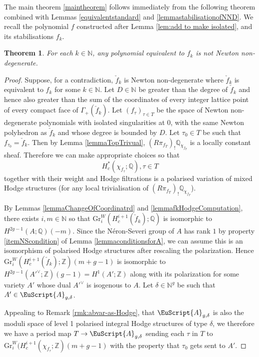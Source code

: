 \documentclass[11pt]{amsart}
\newtheorem{theorem}{Theorem}[section]
\newcommand{\scrA}{\EuScript{A}}
\newcommand{\bZ}{\mathbb{Z}}
\newcommand{\bQ}{\mathbb{Q}}
\newcommand{\bN}{\mathbb{N}}
\numberwithin{equation}{section}
\newcommand{\Gr}{\mathrm{Gr}}
\begin{document}
The main theorem \ref{maintheorem} follows immediately from the following theorem combined with Lemmas \ref{equivalentstandard} and \ref{lemmastabilisationofNND}. We recall the polynomial $f$ constructed after Lemma \ref{lem:add to make isolated}, and its stabilisations $f_k$.

\begin{theorem} \label{theoremfknotstablydegenerate}
	For each $k \in \bN$, any polynomial equivalent to $f_k$ is \emph{not} Newton non-degenerate.
\end{theorem}
\begin{proof}
	Suppose, for a contradiction, $\check{f}_k$ is Newton non-degenerate where $\check{f}_k$ is equivalent to $f_k$ for some $k \in \bN$.
	Let $D \in \bN$ be greater than the degree of $\check{f}_k$ and hence also greater than the sum of the coordinates of every integer lattice point of every compact face of $\Gamma_+(\check{f}_k)$.
	Let $(f_\tau)_{\tau \in T}$ be the space of Newton non-degenerate polynomials with isolated singularities at $0$, with the same Newton polyhedron as $\check{f}_k$ and whose degree is bounded by $D$. Let $\tau_0 \in T$ be such that $f_{\tau_0} = \check{f}_k$. Then by Lemma \ref{lemmaTopTrivual},
	$(R\pi_{f_T})_!\bQ_{\chi_{f_T}}$ is a locally constant sheaf.
	Therefore we can make appropriate choices so that
	\begin{equation}
		H^*_c(\chi_{f_\tau};\bQ), \tau \in T
	\end{equation}
	together with their weight and Hodge filtrations
	is a polarised variation of mixed Hodge structures (for any local trivialisation of $(R\pi_{f_T})_!\bQ_{\chi_{f_T}}$).

	By Lemmas \ref{lemmaChangeOfCoordinatrd} and \ref{lemmafkHodgeComputation}, there exists $i,m \in \bN$ so that $\Gr^W_i(H^{i+1}_c(\check{f}_k);\bQ)$ is isomorphic to $H^{2g-1}(A;\bQ)(-m)$. Since the N\'eron-Severi group of $A$ has rank $1$ by property \eqref{itemNScondition} of Lemma \ref{lemmaconditionsforA}, we can assume this is an isomorphism of polarised Hodge structures after rescaling the polarization.
	Hence $\Gr^W_i(H^{i+1}_c(\check{f}_k);\bZ)(m+g-1)$ is isomorphic to $H^{2g-1}({A'}^\vee;\bZ)(g-1) = H^1(A';\bZ)$ along with its polarization for some variety $A'$ whose dual ${A'}^\vee$ is isogenous to $A$. Let $\delta \in \bN^g$ be such that $A' \in \scrA_{g,\delta}$.


	Appealing to Remark \ref{rmk:abvar-as-Hodge}, that $\scrA_{g,\delta}$ is also the moduli space of level 1 polarised integral Hodge structures of type $\delta$, we therefore we have a period map
	$T \to \scrA_{g,\delta}$ sending each $\tau$ in $T$ to
	$\Gr^W_i(H^{i+1}_c(\chi_{f_\tau};\bZ)(m+g-1)$ with the property that $\tau_0$ gets sent to $A'$.



\end{proof}
\end{document}
